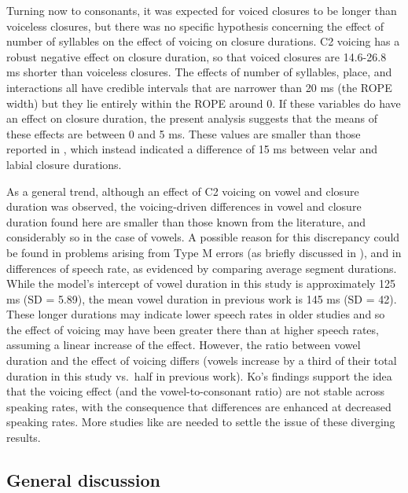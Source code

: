 \documentclass[12pt,a4paper,]{article}
\begin{document}
Turning now to consonants, it was expected for voiced closures to be
longer than voiceless closures, but there was no specific hypothesis
concerning the effect of number of syllables on the effect of voicing on
closure durations. C2 voicing has a robust negative effect on closure
duration, so that voiced closures are 14.6-26.8 ms shorter than
voiceless closures. The effects of number of syllables, place, and
interactions all have credible intervals that are narrower than 20 ms
(the ROPE width) but they lie entirely within the ROPE around 0. If
these variables do have an effect on closure duration, the present
analysis suggests that the means of these effects are between 0 and 5
ms. These values are smaller than those reported in \citet{sharf1962},
which instead indicated a difference of 15 ms between velar and labial
closure durations.

As a general trend, although an effect of C2 voicing on vowel and
closure duration was observed, the voicing-driven differences in vowel
and closure duration found here are smaller than those known from the
literature, and considerably so in the case of vowels. A possible reason
for this discrepancy could be found in problems arising from Type M
errors (as briefly discussed in ), and in differences of
speech rate, as evidenced by comparing average segment durations. While
the model's intercept of vowel duration in this study is approximately
125 ms (SD = 5.89), the mean vowel duration in previous work is 145 ms
(SD = 42). These longer durations may indicate lower speech rates in
older studies and so the effect of voicing may have been greater there
than at higher speech rates, assuming a linear increase of the effect.
However, the ratio between vowel duration and the effect of voicing
differs (vowels increase by a third of their total duration in this
study vs.~half in previous work). Ko's findings \citeyear{ko2018}
support the idea that the voicing effect (and the vowel-to-consonant
ratio) are not stable across speaking rates, with the consequence that
differences are enhanced at decreased speaking rates. More studies like
\citet{ko2018} are needed to settle the issue of these diverging
results.

\hypertarget{general-discussion}{%
\subsection{General discussion}\label{general-discussion}}

\label{s:gen-disc}
\end{document}
